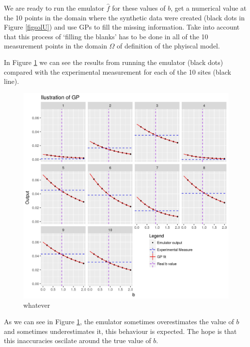 \documentclass[12pt]{book}
\begin{document}
We are ready to run the emulator $\hat{f}$ for these values of $b$, get a numerical value at
the 10 points in the domain where the synthetic data were created (black dots in Figure \ref{figsolU})
and use GPs to fill the missing information. Take into account that this process of `filling the blanks'
has to be done in all of the 10 measurement points in the domain $\Omega$ of definition of the phyiscal model.

In Figure \ref{fignofitted} we can see the results from running the emulator (black dots) compared
with the experimental measurement for each of the 10 sites (black line).

\begin{figure}[H]
\centering
\includegraphics[scale=0.7]{./FigChap3/fitted}
\caption{whatever}
\label{fignofitted}
\end{figure}

As we can see in Figure \ref{fignofitted}, the emulator sometimes overestimates the value of $b$ and sometimes
underestimates it, this behaviour is expected. The hope is that this inaccuracies oscilate around the true
value of $b$.
\end{document}
